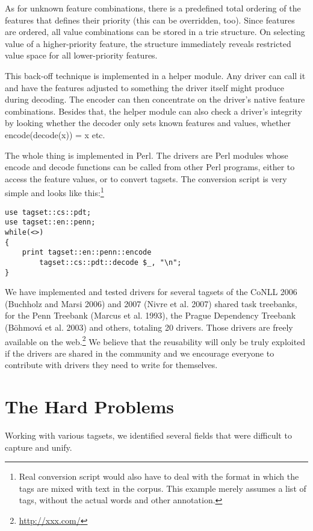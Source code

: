 \documentclass[11pt]{article}
\begin{document}
As for unknown feature combinations, there is a predefined total ordering of the features that defines their priority (this can be overridden, too). Since features are ordered, all value combinations can be stored in a trie structure. On selecting value of a higher-priority feature, the structure immediately reveals restricted value space for all lower-priority features.

This back-off technique is implemented in a helper module. Any driver can call it and have the features adjusted to something the driver itself might produce during decoding. The encoder can then concentrate on the driver’s native feature combinations. Besides that, the helper module can also check a driver’s integrity by looking whether the decoder only sets known features and values, whether encode(decode(x)) = x etc.

The whole thing is implemented in Perl. The drivers are Perl modules whose encode and decode functions can be called from other Perl programs, either to access the feature values, or to convert tagsets. The conversion script is very simple and looks like this:\footnote{Real conversion script would also have to deal with the format in which the tags are mixed with text in the corpus. This example merely assumes a list of tags, without the actual words and other annotation.}

\begin{lstlisting}
use tagset::cs::pdt;
use tagset::en::penn;
while(<>)
{
    print tagset::en::penn::encode
        tagset::cs::pdt::decode $_, "\n";
}
\end{lstlisting}

We have implemented and tested drivers for several tagsets of the CoNLL 2006 (Buchholz and Marsi 2006) and 2007 (Nivre et al. 2007) shared task treebanks, for the Penn Treebank (Marcus et al. 1993), the Prague Dependency Treebank (Böhmová et al. 2003) and others, totaling 20 drivers. Those drivers are freely available on the web.\footnote{\url{http://xxx.com/}}
We believe that the reusability will only be truly exploited if the drivers are shared in the community and we encourage everyone to contribute with drivers they need to write for themselves.

\section{The Hard Problems}
\label{sec:hard}

Working with various tagsets, we identified several fields that were difficult to capture and unify.
\end{document}
